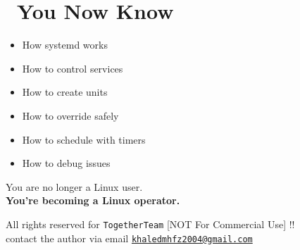 \documentclass[12pt]{article}
\newcommand{\rocketicon}{\faRocket}
\begin{document}
\section*{\rocketicon\ You Now Know}

\begin{itemize}
    \item How systemd works
    \item How to control services
    \item How to create units
    \item How to override safely
    \item How to schedule with timers
    \item How to debug issues
\end{itemize}

\begin{infobox}
\begin{center}
You are no longer a Linux user.\\
\large\textbf{You're becoming a Linux operator.} \rocketicon
\end{center}
\end{infobox}

\vspace{\fill}
\begin{center}
\color{muted}
All rights reserved for \texttt{TogetherTeam} [NOT For Commercial Use] !!\\
contact the author via email \href{mailto:khaledmhfz2004@gmail.com}{\texttt{khaledmhfz2004@gmail.com}}
\end{center}
\end{document}
